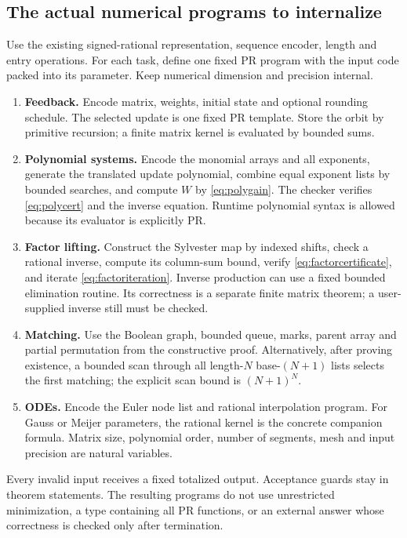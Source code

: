 \subsection{The actual numerical programs to internalize}

Use the existing signed-rational representation, sequence encoder, length and entry operations. For each task, define one fixed PR program with the input code packed into its parameter. Keep numerical dimension and precision internal.

\begin{enumerate}[leftmargin=*,itemsep=3pt]
\item \textbf{Feedback.} Encode matrix, weights, initial state and optional rounding schedule. The selected update is one fixed PR template. Store the orbit by primitive recursion; a finite matrix kernel is evaluated by bounded sums.
\item \textbf{Polynomial systems.} Encode the monomial arrays and all exponents, generate the translated update polynomial, combine equal exponent lists by bounded searches, and compute \(W\) by \eqref{eq:polygain}. The checker verifies \eqref{eq:polycert} and the inverse equation. Runtime polynomial syntax is allowed because its evaluator is explicitly PR.
\item \textbf{Factor lifting.} Construct the Sylvester map by indexed shifts, check a rational inverse, compute its column-sum bound, verify \eqref{eq:factorcertificate}, and iterate \eqref{eq:factoriteration}. Inverse production can use a fixed bounded elimination routine. Its correctness is a separate finite matrix theorem; a user-supplied inverse still must be checked.
\item \textbf{Matching.} Use the Boolean graph, bounded queue, marks, parent array and partial permutation from the constructive proof. Alternatively, after proving existence, a bounded scan through all length-\(N\) base-\((N+1)\) lists selects the first matching; the explicit scan bound is \((N+1)^N\).
\item \textbf{ODEs.} Encode the Euler node list and rational interpolation program. For Gauss or Meijer parameters, the rational kernel is the concrete companion formula. Matrix size, polynomial order, number of segments, mesh and input precision are natural variables.
\end{enumerate}

Every invalid input receives a fixed totalized output. Acceptance guards stay in theorem statements. The resulting programs do not use unrestricted minimization, a type containing all PR functions, or an external answer whose correctness is checked only after termination.

